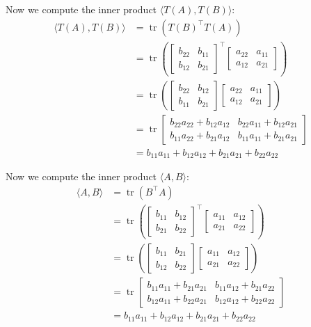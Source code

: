 \documentclass{article}
\begin{document}
Now we compute the inner product $\langle T(A),T(B)\rangle$:
\begin{align*}
  \langle T(A),T(B)\rangle&=\operatorname{tr}(T(B)^\top T(A))\\
  &=\operatorname{tr}\left(\begin{bmatrix}
    b_{22}&b_{11}\\b_{12}&b_{21}
  \end{bmatrix}^\top\begin{bmatrix}
    a_{22}&a_{11}\\a_{12}&a_{21}
  \end{bmatrix}\right)\\
  &=\operatorname{tr}\left(\begin{bmatrix}
    b_{22}&b_{12}\\b_{11}&b_{21}
  \end{bmatrix}\begin{bmatrix}
    a_{22}&a_{11}\\a_{12}&a_{21}
  \end{bmatrix}\right)\\
  &=\operatorname{tr}\begin{bmatrix}b_{22}a_{22}+b_{12}a_{12}&b_{22}a_{11}+b_{12}a_{21}\\ b_{11}a_{22}+b_{21}a_{12}&b_{11}a_{11}+b_{21}a_{21}\end{bmatrix}\\
  &=b_{11}a_{11}+b_{12}a_{12}+b_{21}a_{21}+b_{22}a_{22}
\end{align*}

Now we compute the inner product $\langle A,B\rangle$:
\begin{align*}
  \langle A,B\rangle&=\operatorname{tr}(B^\top A)\\
  &=\operatorname{tr}\left(\begin{bmatrix}
    b_{11}&b_{12}\\b_{21}&b_{22}
  \end{bmatrix}^\top\begin{bmatrix}
    a_{11}&a_{12}\\a_{21}&a_{22}
  \end{bmatrix}\right)\\
  &=\operatorname{tr}\left(\begin{bmatrix}
    b_{11}&b_{21}\\b_{12}&b_{22}
  \end{bmatrix}\begin{bmatrix}
    a_{11}&a_{12}\\a_{21}&a_{22}
  \end{bmatrix}\right)\\
  &=\operatorname{tr}\begin{bmatrix}b_{11}a_{11}+b_{21}a_{21}&b_{11}a_{12}+b_{21}a_{22}\\ b_{12}a_{11}+b_{22}a_{21}&b_{12}a_{12}+b_{22}a_{22}\end{bmatrix}\\
  &=b_{11}a_{11}+b_{12}a_{12}+b_{21}a_{21}+b_{22}a_{22}
\end{align*}
\end{document}
